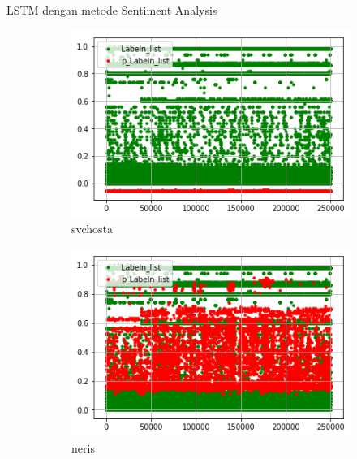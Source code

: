 \documentclass[t]{beamer}
\begin{document}
\begin{frame}{LSTM dengan metode Sentiment Analysis}
    \begin{figure}[H]
        \centering
        \begin{subfigure}[b]{.25\linewidth}
        \includegraphics[width=\textwidth]{public/assets/img/lstms_svchosta_pred.png}
        \caption{svchosta}
        \end{subfigure}
        \begin{subfigure}[b]{.25\linewidth}
        \includegraphics[width=\textwidth]{public/assets/img/lstms_neris_pred.png}
        \caption{neris}
        \end{subfigure}
        \begin{subfigure}[b]{.25\linewidth}

\end{subfigure}
\end{figure}
\end{frame}
\end{document}
